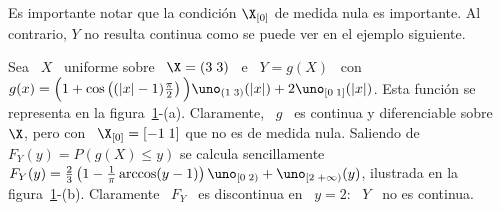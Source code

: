 Es  importante   notar  que  la   condici\'on  $\X_{[0]}$  de  medida   nula  es
importante. Al  contrario, $Y$  no resulta  continua como se  puede ver  en el
ejemplo siguiente.
%
\begin{ejemplo}
\label{Ej:MP:X0MedidaNoNula}
%
Sea \ $X$ \ uniforme sobre  \ $\X = ( 3 \; 3)$ \ e \ $Y  = g(X)$ \ con \ $g(x) =
\Big(  1 +  \cos\left(  (|x|-1) \frac{\pi}{2} \right) \Big)  \uno_{(1 \;  3)}(|x|) +  2
  \uno_{[0    \;   1]}(|x|)$.     Esta    funci\'on   se    representa   en    la
  figura~\ref{Fig:MP:TransformacionVANoContinua}-(a).   Claramente, \  $g$  \ es
  continua y diferenciable sobre $\X$, pero con \ $\X_{[0]} = [ -1 \; 1]$ que no
  es  de  medida  nula.   Saliendo  de  $F_Y(y) =  P(g(X)  \le  y)$  se  calcula
  sencillamente  $F_Y(y) =  \frac23 \left(  1 -  \frac1\pi  \arccos(y-1) \right)
  \uno_{[0   \;   2)}   +   \uno_{[   2  \;   +\infty)}(y)$,   ilustrada   en   la
  figura~\ref{Fig:MP:TransformacionVANoContinua}-(b).   Claramente \ $F_Y$  \ es
  discontinua en \ $y = 2$: \ $Y$ \ no es continua.
  \begin{figure}[h!]
  \begin{center}  \end{center}
  \label{Fig:MP:TransformacionVANoContinua}
  \end{figure}
\end{ejemplo}

